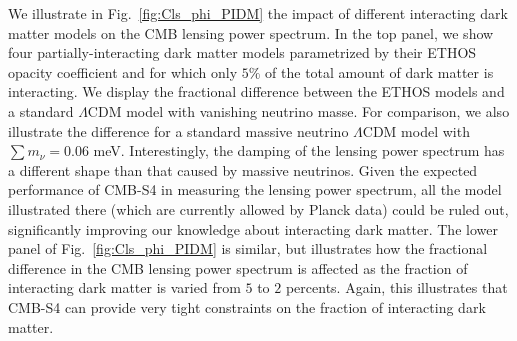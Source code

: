 We illustrate in Fig.~\ref{fig:Cls_phi_PIDM} the impact of different interacting dark matter models on the CMB lensing power spectrum. In the top panel, we show four partially-interacting dark matter models parametrized by their ETHOS opacity coefficient and for which only $5\%$ of the total amount of dark matter is interacting. We display the fractional difference between the ETHOS models and a standard $\Lambda$CDM model with vanishing neutrino masse. For comparison, we also illustrate the difference for a standard massive neutrino $\Lambda$CDM model with $\sum m_\nu = 0.06$ meV.  Interestingly, the damping of the lensing power spectrum has a different shape than that caused by massive neutrinos. Given the expected performance of CMB-S4 in measuring the lensing power spectrum, all the model illustrated there (which are currently allowed by Planck data) could be ruled out, significantly improving our knowledge about interacting dark matter. The lower panel of Fig.~\ref{fig:Cls_phi_PIDM} is similar, but illustrates how the fractional difference in the CMB lensing power spectrum is affected as the fraction of interacting dark matter is varied from $5$ to $2$ percents. Again, this illustrates that CMB-S4 can provide very tight constraints on the fraction of interacting dark matter.

